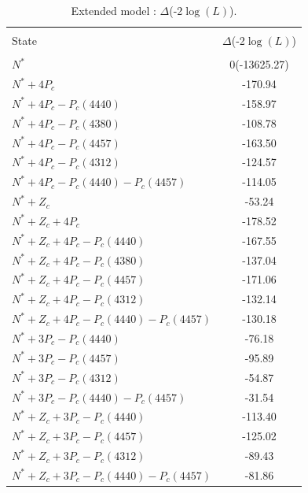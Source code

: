 \begin{table}[htb]
\centering
\caption{ Extended model : $\Delta$(-2$\log(L)$). }
\label{tab:LL_extend}
\vspace{0.2cm}
\begin{tabular}{lc }
\hline\\[-2.5ex]
 State                                  &   $\Delta$(-2$\log(L)$)  \\ 
 \hline \\[-2.5ex]
 $N^*$                                  &   0(-13625.27)    \\
 $N^*+4P_c$                             &   -170.94    \\
 $N^*+4P_c-P_c(4440)$                   &   -158.97    \\
 $N^*+4P_c-P_c(4380)$                   &   -108.78    \\
 $N^*+4P_c-P_c(4457)$                   &   -163.50    \\
 $N^*+4P_c-P_c(4312)$                   &   -124.57    \\
 $N^*+4P_c-P_c(4440)-P_c(4457)$         &   -114.05    \\
 \hline
 $N^*+Z_c$                              &   -53.24    \\
 $N^*+Z_c+4P_c$                         &   -178.52    \\
 $N^*+Z_c+4P_c-P_c(4440)$               &   -167.55    \\
 $N^*+Z_c+4P_c-P_c(4380)$               &   -137.04    \\
 $N^*+Z_c+4P_c-P_c(4457)$               &   -171.06    \\
 $N^*+Z_c+4P_c-P_c(4312)$               &   -132.14    \\
 $N^*+Z_c+4P_c-P_c(4440)-P_c(4457)$     &   -130.18    \\
\hline
 $N^*+3P_c-P_c(4440)$                   &   -76.18    \\
 $N^*+3P_c-P_c(4457)$                   &   -95.89    \\
 $N^*+3P_c-P_c(4312)$                   &   -54.87    \\
 $N^*+3P_c-P_c(4440)-P_c(4457)$         &   -31.54    \\
\hline
 $N^*+Z_c+3P_c-P_c(4440)$               &   -113.40   \\
 $N^*+Z_c+3P_c-P_c(4457)$               &   -125.02   \\
 $N^*+Z_c+3P_c-P_c(4312)$               &   -89.43    \\
 $N^*+Z_c+3P_c-P_c(4440)-P_c(4457)$     &   -81.86    \\
 \hline
\end{tabular}
\end{table}

